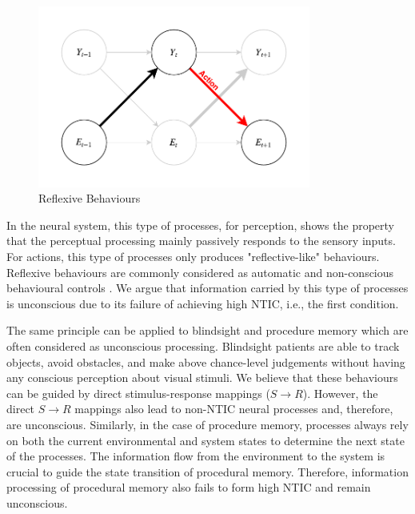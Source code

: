 \documentclass[utf8]{article}
\begin{document}
    		\begin{figure}[H]
    			\includegraphics[width=0.8\textwidth]{WritingMaterials/Fig_Reflexive/Reflexive.pdf}
    			\caption{Reflexive Behaviours}
    			\label{fig:reflexive}
    		\end{figure}        
            
            In the neural system, this type of processes, for perception, shows the property that the perceptual processing mainly passively responds to the sensory inputs. For actions, this type of processes only produces "reflective-like" behaviours. Reflexive behaviours are commonly considered as automatic and non-conscious behavioural controls \citep{casali2013theoretically}. We argue that information carried by this type of processes is unconscious due to its failure of achieving high NTIC, i.e., the first condition. 
            
            The same principle can be applied to blindsight and procedure memory  which are often considered as unconscious processing. Blindsight patients are able to track objects, avoid obstacles, and make above chance-level judgements without having any conscious perception about visual stimuli. We believe that these behaviours can be guided by direct stimulus-response mappings ($S\rightarrow{}R$). However, the direct $S\rightarrow{}R$ mappings also lead to non-NTIC neural processes  and, therefore, are unconscious. Similarly, in the case of procedure memory, processes always rely on both the current environmental and system states to determine the next state of the processes. The information flow from the environment to the system is crucial to guide the state transition of procedural memory. Therefore, information processing of procedural memory also fails to form high NTIC and remain unconscious. 
            
\end{document}
